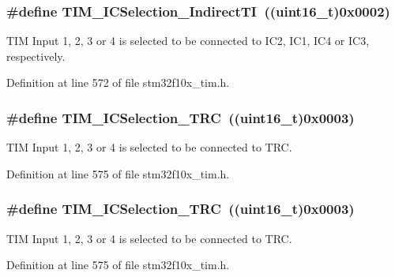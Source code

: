 \subsubsection[{\texorpdfstring{T\+I\+M\+\_\+\+I\+C\+Selection\+\_\+\+Indirect\+TI}{TIM_ICSelection_IndirectTI}}]{\setlength{\rightskip}{0pt plus 5cm}\#define T\+I\+M\+\_\+\+I\+C\+Selection\+\_\+\+Indirect\+TI~(({\bf uint16\+\_\+t})0x0002)}\hypertarget{group___t_i_m___input___capture___selection_ga2289b684133ac0b81ddfcd860d01b144}{}\label{group___t_i_m___input___capture___selection_ga2289b684133ac0b81ddfcd860d01b144}
T\+IM Input 1, 2, 3 or 4 is selected to be connected to I\+C2, I\+C1, I\+C4 or I\+C3, respectively. 

Definition at line 572 of file stm32f10x\+\_\+tim.\+h.

\subsubsection[{\texorpdfstring{T\+I\+M\+\_\+\+I\+C\+Selection\+\_\+\+T\+RC}{TIM_ICSelection_TRC}}]{\setlength{\rightskip}{0pt plus 5cm}\#define T\+I\+M\+\_\+\+I\+C\+Selection\+\_\+\+T\+RC~(({\bf uint16\+\_\+t})0x0003)}\hypertarget{group___t_i_m___input___capture___selection_ga2cd464e97ffd6ea3208ec65672f9a373}{}\label{group___t_i_m___input___capture___selection_ga2cd464e97ffd6ea3208ec65672f9a373}
T\+IM Input 1, 2, 3 or 4 is selected to be connected to T\+RC. 

Definition at line 575 of file stm32f10x\+\_\+tim.\+h.

\subsubsection[{\texorpdfstring{T\+I\+M\+\_\+\+I\+C\+Selection\+\_\+\+T\+RC}{TIM_ICSelection_TRC}}]{\setlength{\rightskip}{0pt plus 5cm}\#define T\+I\+M\+\_\+\+I\+C\+Selection\+\_\+\+T\+RC~(({\bf uint16\+\_\+t})0x0003)}\hypertarget{group___t_i_m___input___capture___selection_ga2cd464e97ffd6ea3208ec65672f9a373}{}\label{group___t_i_m___input___capture___selection_ga2cd464e97ffd6ea3208ec65672f9a373}
T\+IM Input 1, 2, 3 or 4 is selected to be connected to T\+RC. 

Definition at line 575 of file stm32f10x\+\_\+tim.\+h.

